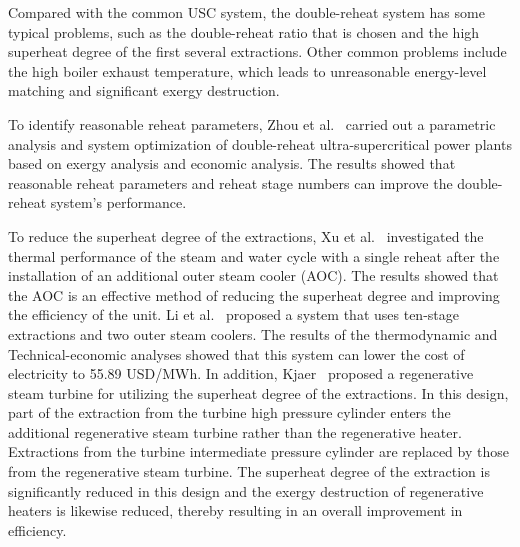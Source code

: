 \documentclass[preprint,12pt]{elsarticle}
\begin{document}
Compared with the common USC system, the double-reheat system has some typical problems, such as the double-reheat ratio that is chosen and the high superheat degree of the first several extractions.
Other common problems include the high boiler exhaust temperature, which leads to unreasonable energy-level matching and significant exergy destruction. 

To identify reasonable reheat parameters, Zhou et al.~\cite{Zhou2016Parametric} carried out a parametric analysis and system optimization of double-reheat ultra-supercritical power plants based on exergy analysis and economic analysis. The results showed that reasonable reheat parameters and reheat stage numbers can improve the double-reheat system's performance.


To reduce the superheat degree of the extractions, Xu et al.~\cite{Xu2015Optimum} investigated the thermal performance of the steam and water cycle with a single reheat after the installation of an additional outer steam cooler (AOC).
The results showed that the AOC is an effective method of reducing the superheat degree and improving the efficiency of the unit.
Li et al.~\cite{Li2014Thermodynamic} proposed a system that uses ten-stage extractions and two outer steam coolers. 
The results of the thermodynamic and Technical-economic analyses showed that this system can lower the cost of electricity to 55.89 USD/MWh.
In addition, Kjaer~\cite{Kjaer2010A} proposed a regenerative steam turbine for utilizing the superheat degree of the extractions.
In this design, part of the extraction from the turbine high pressure cylinder enters the additional regenerative steam turbine rather than the regenerative heater.
Extractions from the turbine intermediate pressure cylinder are replaced by those from the regenerative steam turbine.
The superheat degree of the extraction is significantly reduced in this design and the exergy destruction of regenerative heaters is likewise reduced, thereby resulting in an overall improvement in efficiency.
\end{document}
